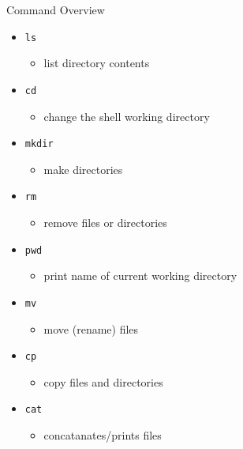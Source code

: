 \documentclass{beamer}
\begin{document}
\begin{frame}{Command Overview}
	\pause
	\begin{itemize}
		\item \texttt{ls}
		\begin{itemize}
			\item list directory contents
		\end{itemize}

		\pause

		\item \texttt{cd}
		\begin{itemize}
			\item change the shell working directory
		\end{itemize}

		\pause

		\item \texttt{mkdir}
		\begin{itemize}
			\item make directories
		\end{itemize}

		\pause

		\item \texttt{rm}
		\begin{itemize}
			\item remove files or directories
		\end{itemize}

		\pause

		\item \texttt{pwd}
		\begin{itemize}
			\item print name of current working directory
		\end{itemize}

		\pause

		\item \texttt{mv}
		\begin{itemize}
			\item move (rename) files
		\end{itemize}

		\pause

		\item \texttt{cp}
		\begin{itemize}
			\item copy files and directories
		\end{itemize}

		\pause

		\item \texttt{cat}
		\begin{itemize}
			\item concatanates/prints files
		\end{itemize}
	\end{itemize}
\end{frame}
\end{document}
